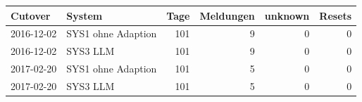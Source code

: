 \begin{tabular}{llrrrr}
\toprule
Cutover & System & Tage & Meldungen & unknown & Resets \\
\midrule
2016-12-02 & SYS1 ohne Adaption & 101 & 9 & 0 & 0 \\
2016-12-02 & SYS3 LLM & 101 & 9 & 0 & 0 \\
2017-02-20 & SYS1 ohne Adaption & 101 & 5 & 0 & 0 \\
2017-02-20 & SYS3 LLM & 101 & 5 & 0 & 0 \\
\bottomrule
\end{tabular}
